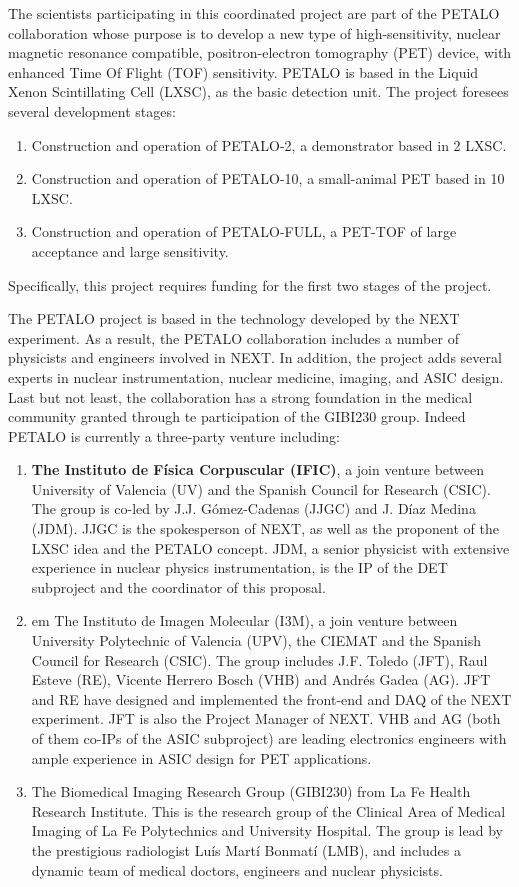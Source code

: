 The scientists participating in this coordinated project are part of the PETALO collaboration
whose purpose is to develop a new type of  high-sensitivity, nuclear magnetic resonance compatible, positron-electron tomography (PET) device, with enhanced Time Of Flight (TOF) sensitivity. PETALO is based in the Liquid Xenon Scintillating Cell (LXSC), as the basic detection unit. The project foresees several development stages:
\begin{enumerate}
\item Construction and operation of PETALO-2, a demonstrator based in 2 LXSC. 
\item Construction and operation of PETALO-10, a small-animal PET based in 10 LXSC.
\item Construction and operation of PETALO-FULL, a PET-TOF of large acceptance and large sensitivity.
\end{enumerate}

Specifically, this project 
requires funding for the first two stages of the project. 

The PETALO project is based in the technology developed by the NEXT experiment. As a result, the PETALO collaboration includes a number of physicists and engineers involved in NEXT. In addition, the project adds several experts in nuclear instrumentation, nuclear medicine, imaging, and ASIC design. Last but not least, the collaboration has a strong foundation in the medical community granted through te participation of the GIBI230 group. Indeed PETALO is currently a three-party venture including:
\begin{enumerate}
\item {\bf The Instituto de Física Corpuscular (IFIC)}, a join venture between University of Valencia (UV) and the Spanish Council for Research (CSIC). The group is co-led by J.J. G\'omez-Cadenas (JJGC) and J. Díaz Medina (JDM).  JJGC is the spokesperson of NEXT, as well as the proponent of the LXSC idea and the PETALO concept. JDM, a senior physicist with extensive experience in nuclear physics instrumentation, is the IP of the DET subproject and the coordinator of this proposal. 
\item {em The Instituto de Imagen Molecular (I3M)}, a join venture between University Polytechnic of Valencia (UPV), the CIEMAT and the Spanish Council for Research (CSIC). The group includes J.F. Toledo (JFT), Raul Esteve (RE), Vicente Herrero Bosch (VHB) and Andrés Gadea (AG). JFT and RE have designed and implemented the front-end and DAQ of the NEXT experiment. JFT is also the Project Manager of NEXT. VHB and AG (both of them co-IPs of the ASIC subproject) are leading electronics engineers with ample experience in ASIC design for PET applications.  
\item The  Biomedical Imaging Research Group (GIBI230) from La Fe Health Research Institute. This is the research group of the Clinical Area of Medical Imaging of La Fe Polytechnics and University Hospital. The group is lead by the prestigious radiologist Luís Martí Bonmatí (LMB), and includes a dynamic team of medical doctors, engineers and nuclear physicists.  
\end{enumerate}

